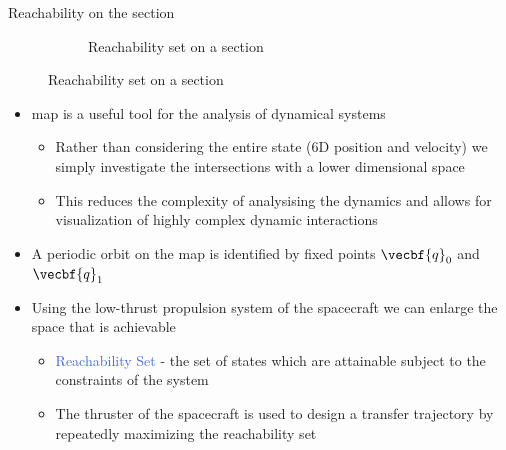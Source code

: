 \documentclass[final, usenames, dvipsnames]{beamer}
\newlength{\twocolwidth}
\def\Emph{\textcolor{RoyalBlue}}
\begin{document}
\begin{frame}[t]
\begin{columns}[T,onlytextwidth]
\begin{column}{\twocolwidth}
\begin{block}{Reachability on the \Poincare section}
\begin{figure}[htbp]
\begin{subfigure}[htbp]{0.5\columnwidth}
\begin{scaletikzpicturetowidth}{\columnwidth}
            \end{scaletikzpicturetowidth}
            \caption*{Reachability set on a \Poincare section\label{fig:reachability_set}}
        \end{subfigure}
    \end{figure}


	\begin{itemize}
		\item \Emph{\Poincare} map is a useful tool for the analysis of dynamical systems
        \begin{itemize}
            \item Rather than considering the entire state (6D position and velocity) we simply investigate the intersections with a lower dimensional space
            \item This reduces the complexity of analysising the dynamics and allows for visualization of highly complex dynamic interactions
        \end{itemize} 
        \item A periodic orbit on the \Poincare map is identified by fixed points \( \vecbf{q}_0 \) and \( \vecbf{q}_1 \)
        \item Using the low-thrust propulsion system of the spacecraft we can enlarge the space that is achievable 
        \begin{itemize}
            \item \Emph{Reachability Set} - the set of states which are attainable subject to the constraints of the system
            \item The thruster of the spacecraft is used to design a transfer trajectory by repeatedly maximizing the reachability set
        \end{itemize}

	\end{itemize}


\end{block}
\end{column}
\end{columns}
\end{frame}
\end{document}
